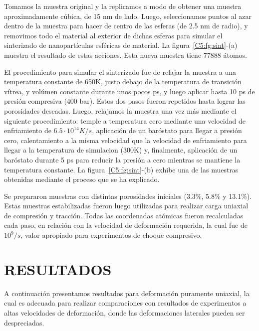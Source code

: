 Tomamos la muestra original y la replicamos a modo de obtener una muestra aproximadamente cúbica, de 15 nm de lado. Luego, seleccionamos puntos
al azar dentro de la muestra para hacer de centro de las esferas (de 2.5 nm de radio), y removimos todo el material al exterior de dichas esferas
para simular el sinterizado de nanopartículas esféricas de material. La figura~\ref{C5:fg:sint}-(a) muestra el resultado de estas acciones. Esta
nueva muestra tiene 77888 átomos.

El procedimiento para simular el sinterizado fue de relajar la muestra a una temperatura constante de 650K, justo debajo de la temperatura
de transición vítrea, y volúmen constante durante unos pocos ps, y luego aplicar hasta 10 ps de presión compresiva (400 bar). Estos dos pasos
fueron repetidos hasta lograr las porosidades deseadas. Luego, relajamos la muestra una vez más mediante el siguiente procedimiento: temple a 
temperatura cero mediante una velocidad de enfriamiento de $6.5 \cdot 10^{14} K/s$, aplicación de un baróstato para llegar a presión
cero, calentamiento a la misma velocidad que la velocidad de enfriamiento para llegar a la temperatura de simulacion (300K) y,
finalmente, aplicación de un baróstato durante 5 ps para reducir la presión a cero mientras se mantiene la temperatura constante. La 
figura~\ref{C5:fg:sint}-(b) exhibe una de las muestras obtenidas mediante el proceso que se ha explicado.

Se prepararon muestras con distintas porosidades iniciales (3.3\%, 5.8\% y 13.1\%). Estas muestras estabilizadas fueron luego utilizadas
para realizar carga uniaxial de compresión y tracción. Todas las coordenadas atómicas fueron recalculadas cada paso, en relación con la
velocidad de deformación requerida, la cual fue de $10^9 /s$, valor apropiado para experimentos de choque compresivo.


\section{RESULTADOS}
\label{S5_3}

A continuación presentamos resultados para deformación puramente uniaxial, la cual es adecuada para realizar comparaciones con resultados de
experimentos a altas velocidades de deformación, donde las deformaciones laterales pueden ser despreciadas.

